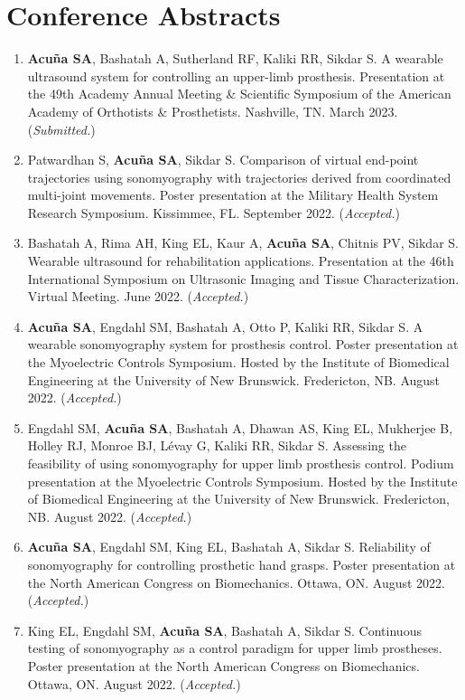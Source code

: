 \documentclass[letterpaper, 10pt]{article}
\begin{document}
\section{Conference Abstracts}
\begin{enumerate}
    \item \textbf{Acuña SA}, Bashatah A, Sutherland RF, Kaliki RR, Sikdar S. A wearable ultrasound system for controlling an upper-limb prosthesis. Presentation at the 49th Academy Annual Meeting \& Scientiﬁc Symposium of the American Academy of Orthotists \& Prosthetists. Nashville, TN. March 2023. (\textit{Submitted.})
    \item Patwardhan S, \textbf{Acuña SA}, Sikdar S. Comparison of virtual end-point trajectories using sonomyography with trajectories derived from coordinated multi-joint movements. Poster presentation at the Military Health System Research Symposium. Kissimmee, FL. September 2022. (\textit{Accepted.})
    \item Bashatah A, Rima AH, King EL, Kaur A, \textbf{Acuña SA}, Chitnis PV, Sikdar S. Wearable ultrasound for rehabilitation applications. Presentation at the 46th International Symposium on Ultrasonic Imaging and Tissue Characterization. Virtual Meeting. June 2022. (\textit{Accepted.})
    \item \textbf{Acuña SA}, Engdahl SM, Bashatah A, Otto P, Kaliki RR, Sikdar S. A wearable sonomyography system for prosthesis control. Poster presentation at the Myoelectric Controls Symposium. Hosted by the Institute of Biomedical Engineering at the University of New Brunswick. Fredericton, NB. August 2022. (\textit{Accepted.})
    \item Engdahl SM, \textbf{Acuña SA}, Bashatah A, Dhawan AS, King EL, Mukherjee B, Holley RJ, Monroe BJ, Lévay G, Kaliki RR, Sikdar S. Assessing the feasibility of using sonomyography for upper limb prosthesis control. Podium presentation at the Myoelectric Controls Symposium. Hosted by the Institute of Biomedical Engineering at the University of New Brunswick. Fredericton, NB. August 2022. (\textit{Accepted.})
    \item \textbf{Acuña SA}, Engdahl SM, King EL, Bashatah A, Sikdar S. Reliability of sonomyography for controlling prosthetic hand grasps. Poster presentation at the North American Congress on Biomechanics. Ottawa, ON. August 2022. (\textit{Accepted.})
    \item King EL, Engdahl SM, \textbf{Acuña SA}, Bashatah A, Sikdar S. Continuous testing of sonomyography as a control paradigm for upper limb prostheses. Poster presentation at the North American Congress on Biomechanics. Ottawa, ON. August 2022. (\textit{Accepted.})

\end{enumerate}
\end{document}
